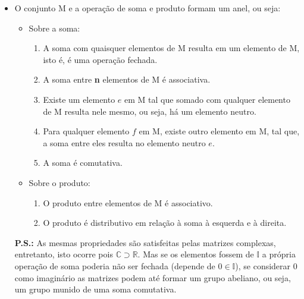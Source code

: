 \documentclass[a4paper,12pt]{article}
\begin{document}
\begin{itemize}
    \item O conjunto M e a operação de soma e produto formam um anel, ou seja:
    
    \begin{itemize}
    
        \item Sobre a soma:

        \begin{enumerate}
        
            \item A soma com quaisquer elementos de M resulta em um elemento de M, isto é, é uma operação fechada.
            
            \item A soma entre \textbf{n} elementos de M é associativa.
            
            \item Existe um elemento $ e $ em M tal que somado com qualquer elemento de M resulta nele mesmo, ou seja, há um elemento neutro.
            
            \item Para qualquer elemento $ f $ em M, existe outro elemento em M, tal que, a soma entre eles resulta no elemento neutro $ e $.
            
            \item A soma é comutativa.
            
        \end{enumerate}

        \item Sobre o produto:
        
        \begin{enumerate}
        
            \item O produto entre elementos de M é associativo.
            
            \item O produto é distributivo em relação à soma à esquerda e à direita.
            
        \end{enumerate}
        
    \end{itemize}
    
\textbf{P.S.:} As mesmas propriedades são satisfeitas pelas matrizes complexas, entretanto, isto ocorre pois $ \mathbb{C} \supset \mathbb{R} $. Mas se os elementos fossem de $ \mathbb{I} $ a própria operação de soma poderia não ser fechada (depende de $ 0 \in \mathbb{I} $), se considerar 0 como imaginário as matrizes podem até formar um grupo abeliano, ou seja, um grupo munido de uma soma comutativa.
    
\end{itemize}
\end{document}
